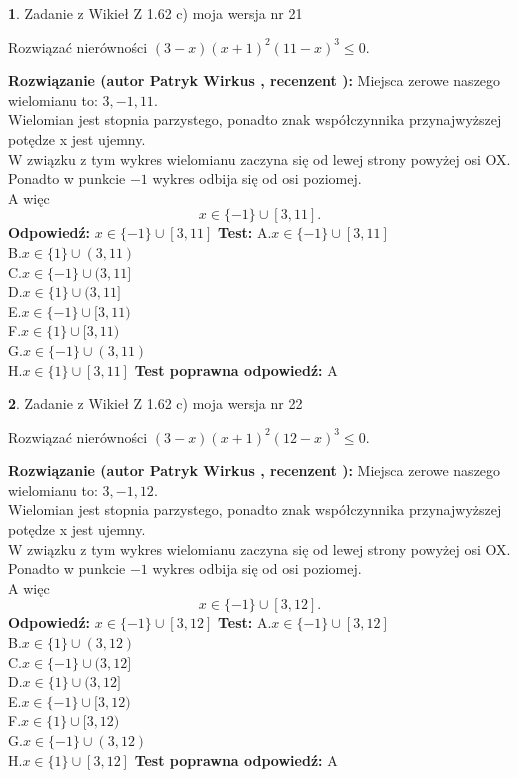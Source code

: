 \documentclass[12pt, a4paper]{article}
\theoremstyle{definition} %
\newtheorem{zad}{}
\newcommand{\zadStart}[1]{\begin{zad}#1\newline}
\newcommand{\zadStop}{\end{zad}}
\newcommand{\rozwStart}[2]{\noindent \textbf{Rozwiązanie (autor #1 , recenzent #2): }\newline}
\newcommand{\rozwStop}{\newline}
\newcommand{\odpStart}{\noindent \textbf{Odpowiedź:}\newline}
\newcommand{\odpStop}{\newline}
\newcommand{\testStart}{\noindent \textbf{Test:}\newline}
\newcommand{\testStop}{\newline}
\newcommand{\kluczStart}{\noindent \textbf{Test poprawna odpowiedź:}\newline}
\newcommand{\kluczStop}{\newline}
\begin{document}
\zadStart{Zadanie z Wikieł Z 1.62 c) moja wersja nr 21}

Rozwiązać nierówności $(3-x)(x+1)^{2}(11-x)^{3}\le0$.
\zadStop
\rozwStart{Patryk Wirkus}{}
Miejsca zerowe naszego wielomianu to: $3, -1, 11$.\\
Wielomian jest stopnia parzystego, ponadto znak współczynnika przy\linebreak najwyższej potędze x jest ujemny.\\ W związku z tym wykres wielomianu zaczyna się od lewej strony powyżej osi OX.\\
Ponadto w punkcie $-1$ wykres odbija się od osi poziomej.\\
A więc $$x \in \{-1\} \cup [3,11].$$
\rozwStop
\odpStart
$x \in \{-1\} \cup [3,11]$
\odpStop
\testStart
A.$x \in \{-1\} \cup [3,11]$\\
B.$x \in \{1\} \cup (3,11)$\\
C.$x \in \{-1\} \cup (3,11]$\\
D.$x \in \{1\} \cup (3,11]$\\
E.$x \in \{-1\} \cup [3,11)$\\
F.$x \in \{1\} \cup [3,11)$\\
G.$x \in \{-1\} \cup (3,11)$\\
H.$x \in \{1\} \cup [3,11]$
\testStop
\kluczStart
A
\kluczStop



\zadStart{Zadanie z Wikieł Z 1.62 c) moja wersja nr 22}

Rozwiązać nierówności $(3-x)(x+1)^{2}(12-x)^{3}\le0$.
\zadStop
\rozwStart{Patryk Wirkus}{}
Miejsca zerowe naszego wielomianu to: $3, -1, 12$.\\
Wielomian jest stopnia parzystego, ponadto znak współczynnika przy\linebreak najwyższej potędze x jest ujemny.\\ W związku z tym wykres wielomianu zaczyna się od lewej strony powyżej osi OX.\\
Ponadto w punkcie $-1$ wykres odbija się od osi poziomej.\\
A więc $$x \in \{-1\} \cup [3,12].$$
\rozwStop
\odpStart
$x \in \{-1\} \cup [3,12]$
\odpStop
\testStart
A.$x \in \{-1\} \cup [3,12]$\\
B.$x \in \{1\} \cup (3,12)$\\
C.$x \in \{-1\} \cup (3,12]$\\
D.$x \in \{1\} \cup (3,12]$\\
E.$x \in \{-1\} \cup [3,12)$\\
F.$x \in \{1\} \cup [3,12)$\\
G.$x \in \{-1\} \cup (3,12)$\\
H.$x \in \{1\} \cup [3,12]$
\testStop
\kluczStart
A
\kluczStop
\end{document}
